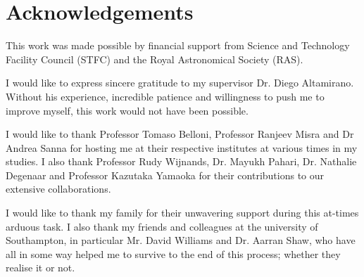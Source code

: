 \chapter*{Acknowledgements}

\par This work was made possible by financial support from Science and Technology Facility Council (STFC) and the Royal Astronomical Society (RAS).
\par I would like to express sincere gratitude to my supervisor Dr. Diego Altamirano.  Without his experience, incredible patience and willingness to push me to improve myself, this work would not have been possible.
\par I would like to thank Professor Tomaso Belloni, Professor Ranjeev Misra and Dr Andrea Sanna for hosting me at their respective institutes at various times in my studies.  I also thank Professor Rudy Wijnands, Dr. Mayukh Pahari, Dr. Nathalie Degenaar and Professor Kazutaka Yamaoka for their contributions to our extensive collaborations.
\par I would like to thank my family for their unwavering support during this at-times arduous task.  I also thank my friends and colleagues at the university of Southampton, in particular Mr. David Williams and Dr. Aarran Shaw, who have all in some way helped me to survive to the end of this process; whether they realise it or not.
